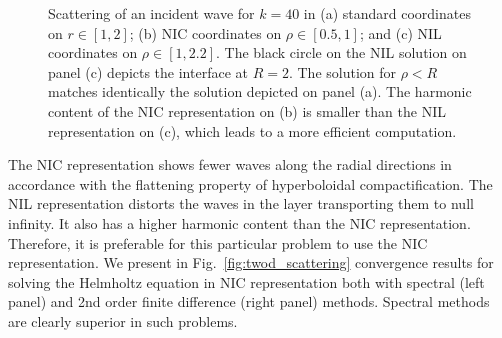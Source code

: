 \documentclass[final,onefignum,onetabnum]{siamart190516}
\begin{document}
\begin{figure}[ht]
{\begin{minipage}[c][1\width]{
	   0.32\textwidth}
	\end{minipage}}
\caption{Scattering of an incident wave for $k=40$ in (a) standard coordinates on $r\in[1,2]$; (b) NIC coordinates on $\rho\in[0.5,1]$; and (c) NIL coordinates on $\rho\in[1,2.2]$. The black circle on the NIL solution on panel (c) depicts the interface at $R=2$. The solution for $\rho<R$ matches identically the solution depicted on panel (a). The harmonic content of the NIC representation on (b) is smaller than the NIL representation on (c), which leads to a more efficient computation.}
\label{fig:soft_sound}
\end{figure}

The NIC representation shows fewer waves along the radial directions in accordance with the flattening property of hyperboloidal compactification. The NIL representation distorts the waves in the layer transporting them to null infinity. It also has a higher harmonic content than the NIC representation. Therefore, it is preferable for this particular problem to use the NIC representation. We present in Fig.~\ref{fig:twod_scattering} convergence results for solving the Helmholtz equation in NIC representation both with spectral (left panel) and 2nd order finite difference (right panel) methods. Spectral methods are clearly superior in such problems.
\end{document}
